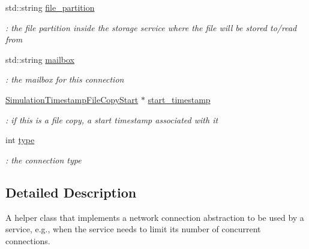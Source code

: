\begin{DoxyCompactItemize}
\mbox{\label{classwrench_1_1_network_connection_aceed24007ae63b2e2a1628663414dc49}} 
std\+::string \hyperlink{classwrench_1_1_network_connection_aceed24007ae63b2e2a1628663414dc49}{file\+\_\+partition}
\begin{DoxyCompactList}\small\item\em \+: the file partition inside the storage service where the file will be stored to/read from \end{DoxyCompactList}\item 
\mbox{\label{classwrench_1_1_network_connection_a7664761ff6891e9657c183d0c1489d18}} 
std\+::string \hyperlink{classwrench_1_1_network_connection_a7664761ff6891e9657c183d0c1489d18}{mailbox}
\begin{DoxyCompactList}\small\item\em \+: the mailbox for this connection \end{DoxyCompactList}\item 
\mbox{\label{classwrench_1_1_network_connection_ad597f7dda3e3b7875c9030086aaeda46}} 
\hyperlink{classwrench_1_1_simulation_timestamp_file_copy_start}{Simulation\+Timestamp\+File\+Copy\+Start} $\ast$ \hyperlink{classwrench_1_1_network_connection_ad597f7dda3e3b7875c9030086aaeda46}{start\+\_\+timestamp}
\begin{DoxyCompactList}\small\item\em \+: if this is a file copy, a start timestamp associated with it \end{DoxyCompactList}\item 
\mbox{\label{classwrench_1_1_network_connection_ae877c47cb51d7b4c3e90874ec5a8b51f}} 
int \hyperlink{classwrench_1_1_network_connection_ae877c47cb51d7b4c3e90874ec5a8b51f}{type}
\begin{DoxyCompactList}\small\item\em \+: the connection type \end{DoxyCompactList}\end{DoxyCompactItemize}


\subsection{Detailed Description}
A helper class that implements a network connection abstraction to be used by a service, e.\+g., when the service needs to limit its number of concurrent connections. 

